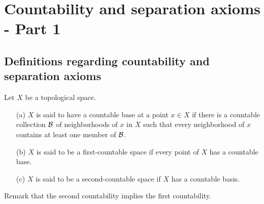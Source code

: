 \section{Countability and separation axioms - Part 1}

\subsection{Definitions regarding countability and separation axioms}

\begin{defi}
    Let $X$ be a topological space.
    \begin{enumerate}
        \item[(a)]
        {
            $X$ is said to have a countable base at a point $x\in X$ if there is a countable collection ${\mathcal{B}}$ of neighborhoods of $x$ in $X$ such that every neighborhood of $x$ contains at least one member of ${\mathcal{B}}$.
        }
        \item[(b)]
        {
            $X$ is said to be a first-countable space if every point of $X$ has a countable base.
        }
        \item[(c)]
        {
            $X$ is said to be a second-countable space if $X$ has a countable basis.
        }
    \end{enumerate}
    Remark that the second countability implies the first countability.
\end{defi}

